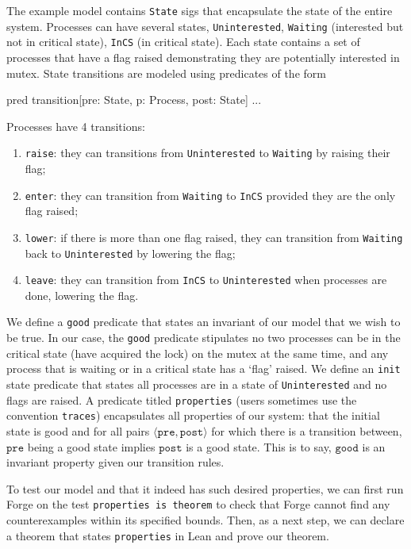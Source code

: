 The example model contains \texttt{State} sigs that encapsulate the state of the entire system. Processes can have several states, \texttt{Uninterested}, \texttt{Waiting} (interested but not in critical state), \texttt{InCS} (in critical state). Each state contains a set of processes that have a flag raised demonstrating they are potentially interested in mutex. State transitions are modeled using predicates of the form
\begin{forge*}
pred transition[pre: State, p: Process, post: State] { ... }
\end{forge*}

Processes have 4 transitions: 
\begin{enumerate}
  \item \texttt{raise}: they can transitions from \texttt{Uninterested} to \texttt{Waiting} by raising their flag;
  \item \texttt{enter}: they can transition from \texttt{Waiting} to \texttt{InCS} provided they are the only flag raised;
  \item \texttt{lower}: if there is more than one flag raised, they can transition from \texttt{Waiting} back to \texttt{Uninterested} by lowering the flag;
  \item \texttt{leave}: they can transition from \texttt{InCS} to \texttt{Uninterested} when processes are done, lowering the flag. 
\end{enumerate}

We define a \texttt{good} predicate that states an invariant of our model that we wish to be true. In our case, the \texttt{good} predicate stipulates no two processes can be in the critical state (have acquired the lock) on the mutex at the same time, and any process that is waiting or in a critical state has a `flag' raised. We define an \texttt{init} state predicate that states all processes are in a state of \texttt{Uninterested} and no flags are raised. A predicate titled \texttt{properties} (users sometimes use the convention \texttt{traces}) encapsulates all properties of our system: that the initial state is good and for all pairs $\langle\texttt{pre}, \texttt{post}\rangle$ for which there is a transition between, $\texttt{pre}$ being a good state implies $\texttt{post}$ is a good state. This is to say, $\texttt{good}$ is an invariant property given our transition rules. 

To test our model and that it indeed has such desired properties, we can first run Forge on the test \texttt{properties is theorem} to check that Forge cannot find any counterexamples within its specified bounds. Then, as a next step, we can declare a theorem that states \texttt{properties} in Lean and prove our theorem. 

